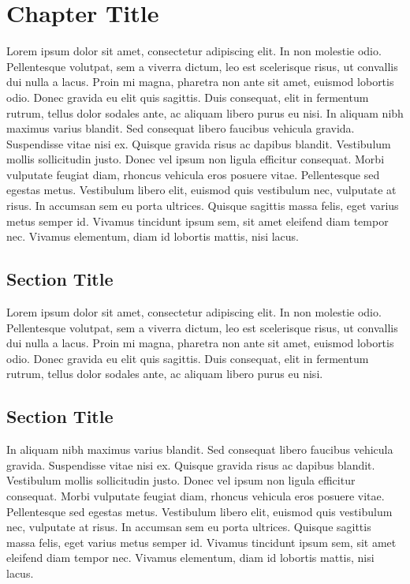 \documentclass[12pt]{report}
\begin{document}
\chapter{Chapter Title}

Lorem ipsum dolor sit amet, consectetur adipiscing elit. In non molestie odio. Pellentesque volutpat, sem a viverra dictum, leo est scelerisque risus, ut convallis dui nulla a lacus. Proin mi magna, pharetra non ante sit amet, euismod lobortis odio. Donec gravida eu elit quis sagittis. Duis consequat, elit in fermentum rutrum, tellus dolor sodales ante, ac aliquam libero purus eu nisi. In aliquam nibh maximus varius blandit. Sed consequat libero faucibus vehicula gravida. Suspendisse vitae nisi ex. Quisque gravida risus ac dapibus blandit. Vestibulum mollis sollicitudin justo. Donec vel ipsum non ligula efficitur consequat. Morbi vulputate feugiat diam, rhoncus vehicula eros posuere vitae. Pellentesque sed egestas metus. Vestibulum libero elit, euismod quis vestibulum nec, vulputate at risus. In accumsan sem eu porta ultrices. Quisque sagittis massa felis, eget varius metus semper id. Vivamus tincidunt ipsum sem, sit amet eleifend diam tempor nec. Vivamus elementum, diam id lobortis mattis, nisi lacus.

\section{Section Title}
Lorem ipsum dolor sit amet, consectetur adipiscing elit. In non molestie odio. Pellentesque volutpat, sem a viverra dictum, leo est scelerisque risus, ut convallis dui nulla a lacus. Proin mi magna, pharetra non ante sit amet, euismod lobortis odio. Donec gravida eu elit quis sagittis. Duis consequat, elit in fermentum rutrum, tellus dolor sodales ante, ac aliquam libero purus eu nisi. 


\section{Section Title}
In aliquam nibh maximus varius blandit. Sed consequat libero faucibus vehicula gravida. Suspendisse vitae nisi ex. Quisque gravida risus ac dapibus blandit. Vestibulum mollis sollicitudin justo. Donec vel ipsum non ligula efficitur consequat. Morbi vulputate feugiat diam, rhoncus vehicula eros posuere vitae. Pellentesque sed egestas metus. Vestibulum libero elit, euismod quis vestibulum nec, vulputate at risus. In accumsan sem eu porta ultrices. Quisque sagittis massa felis, eget varius metus semper id. Vivamus tincidunt ipsum sem, sit amet eleifend diam tempor nec. Vivamus elementum, diam id lobortis mattis, nisi lacus.
\end{document}

